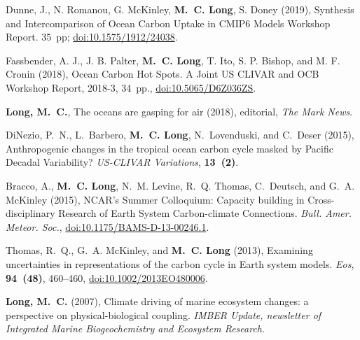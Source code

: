 \documentclass[11pt]{article}
\newcommand{\doi}[1]{\href{http://dx.doi.org/#1}{doi:#1}}
\newcommand{\publink}[1]{}
\begin{document}
\vspace{-1em}
\begin{thebibliography}{99}

Dunne, J., N. Romanou, G. McKinley, \textbf{M.~C. Long}, S. Doney (2019), Synthesis and Intercomparison of Ocean Carbon Uptake in CMIP6 Models Workshop Report. 35~pp; \doi{10.1575/1912/24038}.

Fassbender, A. J., J. B. Palter, \textbf{M.~C. Long}, T. Ito, S. P. Bishop, and M. F. Cronin (2018), Ocean Carbon Hot Spots. A Joint US CLIVAR
and OCB Workshop Report, 2018-3, 34~pp., \doi{10.5065/D6Z036ZS}.

\textbf{Long, M.~C.}, The oceans are gasping for air (2018), editorial, \textit{The Mark News}.

{DiNezio}, P.~N., L.~{Barbero}, \textbf{M.~C. Long}, N.~{Lovenduski}, and C.~Deser (2015), {Anthropogenic changes in the tropical ocean carbon cycle masked by Pacific Decadal Variability?} \textit{US-CLIVAR Variations},  \textbf{13~(2)}.
\publink{DiNezio-Barbero-etal-2015}

Bracco, A., \textbf{M.~C. Long}, N.~M. Levine, R.~Q. Thomas, C.~{Deutsch}, and G.~A. McKinley (2015), {NCAR's Summer Colloquium: Capacity building in Cross-disciplinary Research of Earth System Carbon-climate Connections}. \textit{Bull. Amer. Meteor. Soc.}, \doi{10.1175/BAMS-D-13-00246.1}.
\publink{Bracco-Long-etal-2015}

Thomas, R.~Q., G.~A. McKinley, and \textbf{M.~C. Long} (2013), Examining uncertainties in representations of the carbon cycle in Earth system models. \textit{Eos}, \textbf{94~(48)}, 460--460, \doi{10.1002/2013EO480006}.

\textbf{Long, M.~C.} (2007),
Climate driving of marine ecosystem changes: a perspective on
physical-biological coupling. {\em IMBER Update, newsletter of Integrated Marine
Biogeochemistry and Ecosystem Research}.

\end{thebibliography}

\bigskip
\mydate
\rightline{\today}
\end{document}
